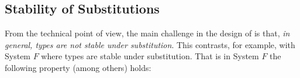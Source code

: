 \begin{comment}
First, if we consider our subtyping lattice as unbounded (i.e. no $\top$ and no $\bot$), then we have that
disjointness is covariant with respect to the subtyping relation.
More formally:
\[ \inferrule {\jwf \Gamma {A \disjoint B} \\ B \subtype C }
              {\jwf \Gamma {A \disjoint C}} \]

To illustrate this, take $A$ as $\tyint$ and $B$ as $\tybool \inter \tychar$.
This lemma states that every supertype of $\tybool \inter \tychar$, namely $\tybool$, $\tychar$ and 
$\tybool \inter \tychar$ itself are also disjoint with $\tyint$.
Coming back to a bounded subtyping lattice, let us now consider both bounds. 
If some type $A$ were to be disjoint with $\bot$, then by the lemma above $A$ will be disjoint to
virtually any type.
This means that, if $A$ is a type variable, then the possible types that it can be instantiated with
are the ones which are disjoint with every other type (otherwise the lemma above will no longer hold).
Clearly $\bot$ is not a suitable option,  
In other words, we can think of $\bot$ as the type as specific as the infinite intersection.
Conversely, $\top$ can be thought as specific - or rather, as general - as the 0-ary intersection.
\end{comment}



\subsection{Stability of Substitutions}
From the technical point of view, the main challenge in the design of
\name is that, \emph{in general, types are not stable under
substitution}. This contrasts, for example, with System $F$ where types
are stable under substitution. That is in System $F$ the following
property (among others) holds: 

